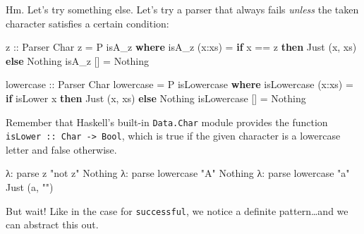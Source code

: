 \documentclass[]{article}
\newenvironment{Shaded}{}{}
\newcommand{\CharTok}[1]{\textcolor[rgb]{0.25,0.44,0.63}{#1}}
\newcommand{\DataTypeTok}[1]{\textcolor[rgb]{0.56,0.13,0.00}{#1}}
\newcommand{\FunctionTok}[1]{\textcolor[rgb]{0.02,0.16,0.49}{#1}}
\newcommand{\KeywordTok}[1]{\textcolor[rgb]{0.00,0.44,0.13}{\textbf{#1}}}
\newcommand{\NormalTok}[1]{#1}
\newcommand{\OperatorTok}[1]{\textcolor[rgb]{0.40,0.40,0.40}{#1}}
\newcommand{\OtherTok}[1]{\textcolor[rgb]{0.00,0.44,0.13}{#1}}
\newcommand{\StringTok}[1]{\textcolor[rgb]{0.25,0.44,0.63}{#1}}
\begin{document}
Hm. Let's try something else. Let's try a parser that always fails \emph{unless}
the taken character satisfies a certain condition:

\begin{Shaded}
\begin{Highlighting}[]
\OtherTok{z ::} \DataTypeTok{Parser} \DataTypeTok{Char}
\NormalTok{z }\OtherTok{=} \DataTypeTok{P}\NormalTok{ isA\_z}
    \KeywordTok{where}
\NormalTok{        isA\_z (x}\OperatorTok{:}\NormalTok{xs) }\OtherTok{=}  \KeywordTok{if}\NormalTok{ x }\OperatorTok{==} \CharTok{\textquotesingle{}z\textquotesingle{}}
                            \KeywordTok{then} \DataTypeTok{Just}\NormalTok{ (x, xs)}
                            \KeywordTok{else} \DataTypeTok{Nothing}
\NormalTok{        isA\_z []     }\OtherTok{=}  \DataTypeTok{Nothing}

\OtherTok{lowercase ::} \DataTypeTok{Parser} \DataTypeTok{Char}
\NormalTok{lowercase }\OtherTok{=} \DataTypeTok{P}\NormalTok{ isLowercase}
    \KeywordTok{where}
\NormalTok{        isLowercase (x}\OperatorTok{:}\NormalTok{xs)  }\OtherTok{=}   \KeywordTok{if} \FunctionTok{isLower}\NormalTok{ x}
                                    \KeywordTok{then} \DataTypeTok{Just}\NormalTok{ (x, xs)}
                                    \KeywordTok{else} \DataTypeTok{Nothing}
\NormalTok{        isLowercase []      }\OtherTok{=}   \DataTypeTok{Nothing}
\end{Highlighting}
\end{Shaded}

Remember that Haskell's built-in \texttt{Data.Char} module provides the function
\texttt{isLower\ ::\ Char\ -\textgreater{}\ Bool}, which is true if the given
character is a lowercase letter and false otherwise.

\begin{Shaded}
\begin{Highlighting}[]
\NormalTok{λ}\OperatorTok{:}\NormalTok{ parse z }\StringTok{"not z"}
\DataTypeTok{Nothing}
\NormalTok{λ}\OperatorTok{:}\NormalTok{ parse lowercase }\StringTok{"A"}
\DataTypeTok{Nothing}
\NormalTok{λ}\OperatorTok{:}\NormalTok{ parse lowercase }\StringTok{"a"}
\DataTypeTok{Just}\NormalTok{ (}\CharTok{\textquotesingle{}a\textquotesingle{}}\NormalTok{, }\StringTok{""}\NormalTok{)}
\end{Highlighting}
\end{Shaded}

But wait! Like in the case for \texttt{successful}, we notice a definite
pattern\ldots and we can abstract this out.
\end{document}
